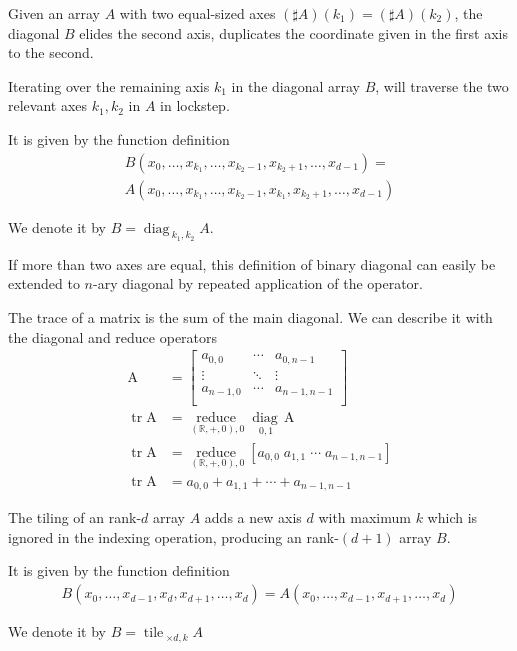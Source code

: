 \documentclass{DIKU-report-variant}
\newcommand\mrm[1]{\mathrm{#1}}
\newcommand\brm[1]{\bm{\mrm{#1}}}
\newcommand\Real{\mathbb{R}}
\newcommand\reduce{\operatorname*{\brm{reduce}\,}}
\newcommand\diag{\operatorname*{\brm{diag}\,}}
\newcommand\tile{\operatorname*{\brm{tile}\,}}
\begin{document}
\begin{definition}
  \label{def:diagonal}
  Given an array \(A\) with two equal-sized axes \((\sharp A)(k_1) = (\sharp A)(k_2)\),
  the diagonal \(B\) elides the second axis, duplicates the coordinate given in the first
  axis to the second.

  Iterating over the remaining axis \(k_1\) in the diagonal array \(B\), will traverse the two relevant
  axes \(k_1,k_2\) in \(A\) in lockstep.

  It is given by the function definition
  \begin{align*}
    B(x_0, \dots, x_{k_1}, \dots, x_{k_2 - 1}, x_{k_2 + 1}, \dots, x_{d-1}) = \\
    A(x_0, \dots, x_{k_1}, \dots, x_{k_2 - 1}, x_{k_1}, x_{k_2 + 1}, \dots, x_{d-1})
  \end{align*}

  We denote it by \(B = \diag_{k_1,k_2} A\).

  If more than two axes are equal, this definition of binary diagonal can easily be extended to
  \(n\)-ary diagonal by repeated application of the operator.
\end{definition}

\begin{example}
  \label{ex:trace}
  The trace of a matrix is the sum of the main diagonal. We can describe it with the diagonal
  and reduce operators
  \begin{align*}
    \brm A &= \begin{bmatrix}
      a_{0,0} & \cdots & a_{0,n{-}1} \\
      \vdots & \ddots & \vdots \\
      a_{n{-}1,0} & \cdots & a_{n{-}1,n{-}1} \\
    \end{bmatrix} \\
    \operatorname*{\brm{tr}} \brm A &= \reduce_{(\Real,+,0),0} \diag_{0,1} \brm A \\
    \operatorname*{\brm{tr}} \brm A &= \reduce_{(\Real,+,0),0} [ a_{0,0}\;a_{1,1}\;\cdots\; a_{n{-}1,n{-}1} ] \\
    \operatorname*{\brm{tr}} \brm A &= a_{0,0}+a_{1,1}+\cdots+ a_{n{-}1,n{-}1} 
  \end{align*}
\end{example}

\begin{definition}
  \label{def:tiling}
  The tiling of an rank-\(d\) array \(A\) adds a new axis \(d\) with maximum \(k\)
  which is ignored in the indexing operation, producing an rank-\((d+1)\) array \(B\).

  It is given by the function definition
  \begin{align*}
    B(x_0, \dots, x_{d-1}, x_d, x_{d+1}, \dots, x_{d}) = A(x_0, \dots, x_{d-1}, x_{d+1}, \dots, x_d)
  \end{align*}

  We denote it by \(B = \tile_{\times d, k} A\)
\end{definition}
\end{document}
